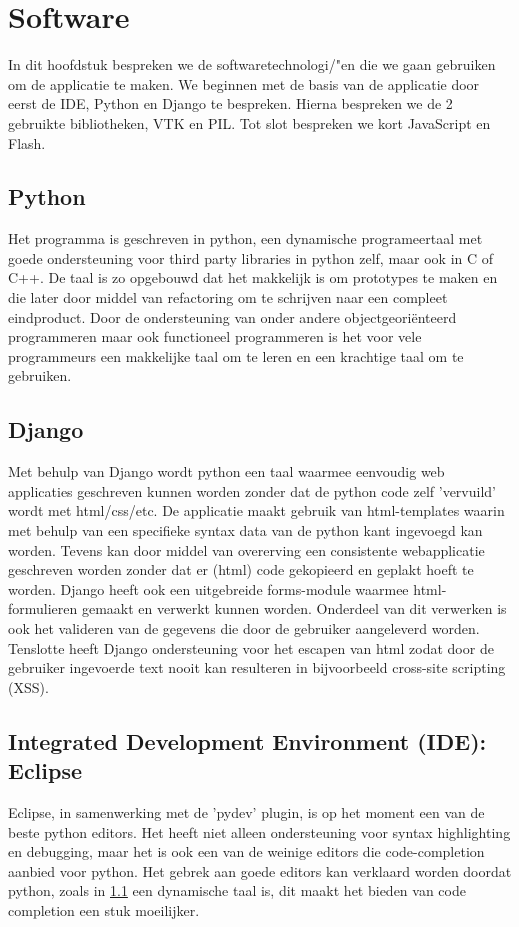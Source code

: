 \section{Software}
\label{Software}
In dit hoofdstuk bespreken we de softwaretechnologi/"{e}n die we gaan gebruiken om de applicatie te maken. 
We beginnen met de basis van de applicatie door eerst de IDE, Python en Django te bespreken. 
Hierna bespreken we de 2 gebruikte bibliotheken, VTK en PIL. 
Tot slot bespreken we kort JavaScript en Flash.

\subsection{Python}
\label{software_python}
Het programma is geschreven in python, een dynamische programeertaal met goede ondersteuning voor third party libraries in python zelf, maar ook in C of C++. De taal is zo opgebouwd dat het makkelijk is om prototypes te maken en die later door middel van refactoring om te schrijven naar een compleet eindproduct. Door de ondersteuning van onder andere objectgeori\"{e}nteerd programmeren maar ook functioneel programmeren is het voor vele programmeurs een makkelijke taal om te leren en een krachtige taal om te gebruiken.

\subsection{Django}
Met behulp van Django wordt python een taal waarmee eenvoudig web applicaties geschreven kunnen worden zonder dat de python code zelf 'vervuild' wordt met html/css/etc. De applicatie maakt gebruik van html-templates waarin met behulp van een specifieke syntax data van de python kant ingevoegd kan worden. Tevens kan door middel van overerving een consistente webapplicatie geschreven worden zonder dat er (html) code gekopieerd en geplakt hoeft te worden. Django heeft ook een uitgebreide forms-module waarmee html-formulieren gemaakt en verwerkt kunnen worden. Onderdeel van dit verwerken is ook het valideren van de gegevens die door de gebruiker aangeleverd worden. Tenslotte heeft Django ondersteuning voor het escapen van html zodat door de gebruiker ingevoerde text nooit kan resulteren in bijvoorbeeld cross-site scripting (XSS).

\subsection{Integrated Development Environment (IDE): Eclipse}
Eclipse, in samenwerking met de 'pydev' plugin, is op het moment een van de beste python editors. Het heeft niet alleen ondersteuning voor syntax highlighting en debugging, maar het is ook een van de weinige editors die code-completion aanbied voor python. Het gebrek aan goede editors kan verklaard worden doordat python, zoals in \ref{software_python} een dynamische taal is, dit maakt het bieden van code completion een stuk moeilijker.

